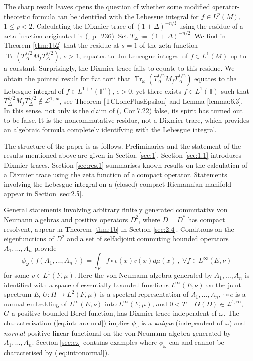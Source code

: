 \documentclass[final,1p]{elsarticle}
\numberwithin{equation}{section}
\theoremstyle{plain}
\theoremstyle{definition}
\begin{document}
The sharp result leaves opens the question of whether some modified operator-theoretic formula can be identified with the Lebesgue integral for $f \in L^p(M)$, $1 \leq p < 2$.  
Calculating the Dixmier trace of $(1+\Delta)^{-n/2}$ using the residue of a zeta function originated in (\cite{CM}, p.~236).  Set $T_\Delta := (1+\Delta)^{-n/2}$.  We find in Theorem \ref{thm:1b2} that the residue at $s=1$ of the zeta function
$\operatorname{Tr}(T_\Delta^{s/2}M_{f}T_\Delta^{s/2})$, $s > 1$, equates to the Lebesgue integral of $f \in L^1(M)$ up to a constant.  Surprisingly, the Dixmier trace fails to equate to this residue.  We obtain the pointed result for flat torii that $\operatorname{Tr}_\omega( T_\Delta^{1/2} M_{f} T_\Delta^{1/2})$ equates to the Lebesgue integral of $f \in L^{1+\epsilon}({\ensuremath{\mathbb{T}}}^n)$, $\epsilon > 0$, yet there exists $f \in L^1({\ensuremath{\mathbb{T}}})$ such that
$T_\Delta^{1/2} M_{f} T_\Delta^{1/2} \notin \mathcal{L}^{1,\infty}$, see Theorem \ref{TCLonePlusEpsilon} and Lemma \ref{lemma:6.3}.
In this sense,  not only is the claim of (\cite{GBVF}, Cor 7.22) false, its spirit has turned out to be false.  It is the noncommutative residue, not a Dixmier trace, which provides an algebraic formula completely identifying with the Lebesgue integral.

\medskip The structure of the paper is as follows. Preliminaries and the statement of the results mentioned above are given in Section \ref{sec:1}.  Section \ref{sec:1.1} introduces Dixmier traces.  Section \ref{sec:res.1} summarises known results on the calculation of a Dixmier trace using the zeta function of a compact operator.  Statements involving the Lebesgue integral on a (closed) compact Riemannian manifold appear in Section \ref{sec:2.5}.  

General statements
involving arbitrary finitely generated commutative von Neumann algebras and positive operators $D^2$, where $D=D^*$ has compact resolvent, appear in Theorem \ref{thm:1b} in Section \ref{sec:2.4}.  Conditions on the eigenfunctions of
$D^2$ and a set of selfadjoint commuting bounded operators $A_1,\ldots,A_n$ provide
\begin{equation} \label{eq:intronormal}
\phi_\omega(f(A_1,\ldots,A_n)) = \int_F f \circ e(x) v(x) d\mu(x) \ , \ {\ensuremath{\forall}} f \in L^\infty(E,\nu)
\end{equation}
for some $v \in L^1(F,\mu)$.  Here the von Neumann algebra generated by $A_1, \ldots, A_n$ is identified with a space of essentially bounded functions $L^\infty(E,\nu)$ on the joint spectrum $E$, $U: H \to L^2(F,\mu)$ is a spectral representation of $A_1, \ldots, A_n$,
$ \cdot \circ e$ is a normal embedding of $L^\infty(E,\nu)$ into $L^\infty(F,\mu)$, and $0 < T = G(D) \in \mathcal{L}^{1,\infty}$, $G$ a positive bounded Borel function, has Dixmier trace independent of $\omega$.  The characterisation (\ref{eq:intronormal})
implies $\phi_\omega$
is a \emph{unique} (independent of $\omega$) and \emph{normal} positive linear functional on the von Neumann algebra generated by $A_1,\ldots,A_n$.  
Section \ref{sec:ex} contains examples where $\phi_\omega$ can and cannot be characterised by (\ref{eq:intronormal}).
\end{document}
